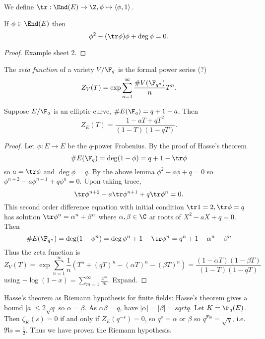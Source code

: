 \documentclass[a4paper]{article}
\theoremstyle{definition}
\begin{document}
We define \(\tr: \End(E) \to \Z, \phi \mapsto \langle \phi, 1 \rangle\).

\begin{lemma}
  If \(\phi \in \End(E)\) then
  \[
    \phi^2 - (\tr \phi) \phi + \deg \phi = 0.
  \]
\end{lemma}

\begin{proof}
  Example sheet 2.
\end{proof}

\begin{definition}
  The \emph{zeta function} of a variety \(V/\F_q\) is the formal power series (?)
  \[
  Z_V(T) = \exp \sum_{n = 1}^\infty \frac{\# V(\F_{q^n})}{n} T^n.
  \]
\end{definition}

\begin{lemma}
  Suppose \(E/\F_q\) is an elliptic curve, \(\# E(\F_q) = q + 1 - a\). Then
  \[
    Z_E(T) = \frac{1 - aT + qT^2}{(1 - T)(1 - qT)}.
  \]
\end{lemma}

\begin{proof}
  Let \(\phi: E \to E\) be the \(q\)-power Frobenius. By the proof of Hasse's theorem
  \[
    \#E(\F_q) = \deg (1 - \phi) = q + 1 - \tr \phi
  \]
  so \(a = \tr \phi\) and \(\deg \phi = q\). By the above lemma \(\phi^2 - a\phi + q = 0\) so \(\phi^{n + 2} - a \phi^{n + 1} + q \phi^n = 0\). Upon taking trace,
  \[
    \tr \phi^{n + 2} - a \tr \phi^{n + 1} + q \tr \phi^n = 0.
  \]
  This second order difference equation with initial condition \(\tr 1 = 2, \tr \phi = q\) has solution \(\tr \phi^n = \alpha^n + \beta^n\) where \(\alpha, \beta \in \C\) ar roots of \(X^2 - aX + q = 0\). Then
  \[
    \# E(\F_{q^n}) = \deg (1 - \phi^n)
    = \deg \phi^n + 1 - \tr \phi^n
    = q^n + 1 - \alpha^n - \beta^n
  \]
  Thus the zeta function is
  \[
    Z_V(T) = \exp \sum_{n = 1}^\infty \frac{1}{n} (T^n + (qT)^n - (\alpha T)^n - (\beta T)^n)
    = \frac{(1 - \alpha T)(1 - \beta T)}{(1 - T)(1 - qT)}
  \]
  using \(-\log (1 - x) = \sum_{m = 1}^\infty \frac{x^m}{m}\). Expand.
\end{proof}

\begin{remark}
  Hasse's theorem as Riemann hypothesis for finite fields: Hasse's theorem gives a bound \(|a| \leq 2 \sqrt q\) so \(\alpha = \overline \beta\). As \(\alpha\beta = q\), have \(|\alpha| = |\beta| = sqrt q\). Let \(K = \F_q(E)\). Then \(\zeta_K(s) = 0\) if and only if \(Z_E(q^{-s}) = 0\), so \(q^s = \alpha \text{ or } \beta\) so \(q^{\Re s} = \sqrt q\), i.e.\ \(\Re s = \frac{1}{2}\). Thus we have proven the Riemann hypothesis.
\end{remark}
\end{document}
